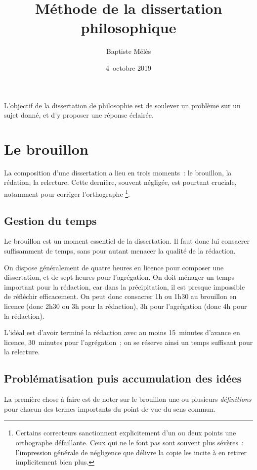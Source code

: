 \documentclass[a4paper,12pt]{article}
\author{Baptiste Mélès}
\date{4 octobre 2019}
\title{Méthode de la dissertation philosophique}
\begin{document}
\maketitle
\setcounter{tocdepth}{3}
\tableofcontents

L'objectif de la dissertation de philosophie est de soulever un problème
sur un sujet donné, et d'y proposer une réponse éclairée.


\section{Le brouillon}
\label{sec-1}

La composition d'une dissertation a lieu en trois moments : le
brouillon, la rédation, la relecture. Cette dernière, souvent négligée,
est pourtant cruciale, notamment pour corriger l'orthographe \footnote{Certains correcteurs sanctionnent explicitement d'un ou deux points
une orthographe défaillante. Ceux qui ne le font pas sont souvent
plus sévères : l'impression générale de négligence que délivre la
copie les incite à en retirer implicitement bien plus.}.

\subsection{Gestion du temps}
\label{sec-1-1}

Le brouillon est un moment essentiel de la dissertation. Il faut donc
lui consacrer suffisamment de temps, sans pour autant menacer la qualité
de la rédaction.

On dispose généralement de quatre heures en licence pour composer une
dissertation, et de sept heures pour l'agrégation. On doit ménager un
temps important pour la rédaction, car dans la précipitation, il est
presque impossible de réfléchir efficacement. On peut donc consacrer 1h
ou 1h30 au brouillon en licence (donc 2h30 ou 3h pour la rédaction), 3h
pour l'agrégation (donc 4h pour la rédaction).

L'idéal est d'avoir terminé la rédaction avec au moins 15 minutes
d'avance en licence, 30 minutes pour l'agrégation ; on se réserve ainsi
un temps suffisant pour la relecture.

\subsection{Problématisation puis accumulation des idées}
\label{sec-1-2}

La première chose à faire est de noter sur le brouillon une ou plusieurs
\emph{définitions} pour chacun des termes importants du point de vue du sens
commun.
\end{document}
